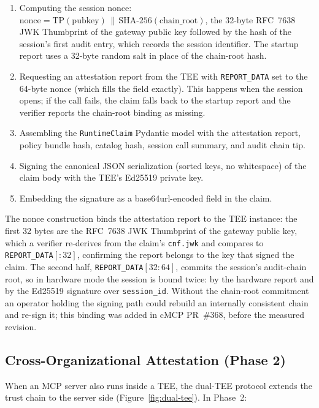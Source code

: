 \begin{enumerate}[leftmargin=1.5em]
  \item Computing the session nonce:
    $\text{nonce} = \text{TP}(\text{pubkey}) \,\|\, \text{SHA-256}(\text{chain\_root})$, the
    32-byte RFC~7638 JWK Thumbprint of the gateway public key followed by the hash of the
    session's first audit entry, which records the session identifier. The startup report
    uses a 32-byte random salt in place of the chain-root hash.
  \item Requesting an attestation report from the TEE with \texttt{REPORT\_DATA} set to the
    64-byte nonce (which fills the field exactly). This happens when the session opens; if
    the call fails, the claim falls back to the startup report and the verifier reports the
    chain-root binding as missing.
  \item Assembling the \texttt{RuntimeClaim} Pydantic model with the attestation report,
    policy bundle hash, catalog hash, session call summary, and audit chain tip.
  \item Signing the canonical JSON serialization (sorted keys, no whitespace) of the claim
    body with the TEE's Ed25519 private key.
  \item Embedding the signature as a base64url-encoded field in the claim.
\end{enumerate}

The nonce construction binds the attestation report to the TEE instance: the first 32
bytes are the RFC~7638 JWK Thumbprint of the gateway public key, which a verifier
re-derives from the claim's \texttt{cnf.jwk} and compares to \texttt{REPORT\_DATA}$[{:}32]$,
confirming the report belongs to the key that signed the claim. The second half,
\texttt{REPORT\_DATA}$[32{:}64]$, commits the session's audit-chain root, so in hardware
mode the session is bound twice: by the hardware report and by the Ed25519 signature over
\texttt{session\_id}. Without the chain-root commitment an operator holding the signing
path could rebuild an internally consistent chain and re-sign it; this binding was added
in cMCP PR~\#368, before the measured revision.

\subsection{Cross-Organizational Attestation (Phase 2)}

When an MCP server also runs inside a TEE, the dual-TEE protocol extends the trust chain to
the server side (Figure~\ref{fig:dual-tee}). In Phase~2:

